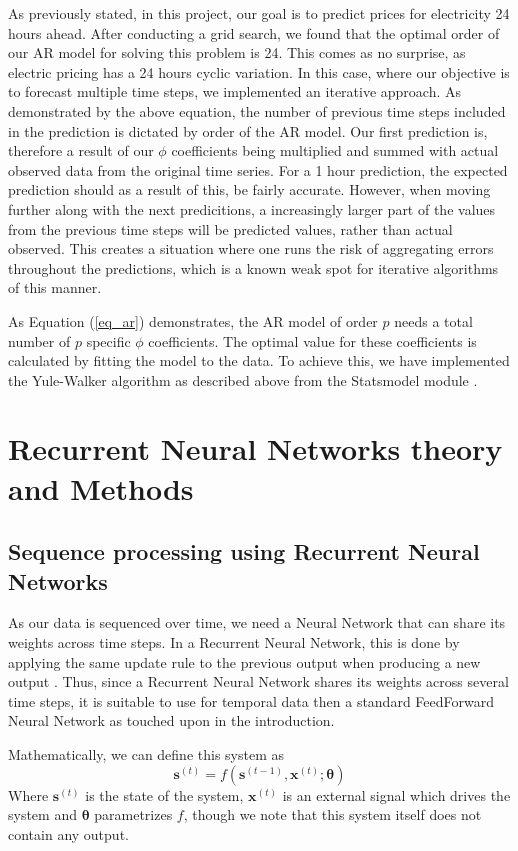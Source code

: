 \documentclass
[twocolumn,
secnumarabic,
nobibnotes,
aps,
prl,
reprint,
groupedaddress,
amsmath,
amssymb,
]{revtex4-2}
\begin{document}
As previously stated, in this project, our goal is to predict prices for electricity 24 hours ahead. After conducting a grid search, we found that the optimal order of our AR model for solving this problem is 24. This comes as no surprise, as electric pricing has a 24 hours cyclic variation. In this case, where our objective is to forecast multiple time steps, we implemented an iterative approach. As demonstrated by the above equation, the number of previous time steps included in the prediction is dictated by order of the AR model. Our first prediction is, therefore a result of our $\phi$ coefficients being multiplied and summed with actual observed data from the original time series. For a 1 hour prediction, the expected prediction should as a result of this, be fairly accurate. However, when moving further along with the next predicitions, a increasingly larger part of the values from the previous time steps will be predicted values, rather than actual observed. This creates a situation where one runs the risk of aggregating errors throughout the predictions, which is a known weak spot for iterative algorithms of this manner. 

As Equation (\ref{eq_ar}) demonstrates, the AR model of order $p$ needs a total number of $p$ specific $\phi$ coefficients. The optimal value for these coefficients is calculated by fitting the model to the data. To achieve this, we have implemented the Yule-Walker algorithm as described above from the Statsmodel module \cite{seabold2010statsmodels}.

\section{Recurrent Neural Networks theory and Methods}

\subsection{Sequence processing using Recurrent Neural Networks}
As our data is sequenced over time, we need a Neural Network that can share its weights across time steps. In a Recurrent Neural Network, this is done by applying the same update rule to the previous output when producing a new output \cite{Goodfellow2016}. Thus, since a Recurrent Neural Network shares its weights across several time steps, it is suitable to use for temporal data then a standard FeedForward Neural Network as touched upon in the introduction.

Mathematically, we can define this system as
\begin{equation}
  \nonumber
  \bm{s}^{(t)} = f(\bm{s}^{(t-1)},\bm{x}^{(t)};\bm{\theta})
\end{equation}
Where $\bm{s}^{(t)}$ is the state of the system, $\bm{x}^{(t)}$ is an external signal which drives the system and $\bm{\theta}$ parametrizes $f$, though we note that this system itself does not contain any output. 
\end{document}
